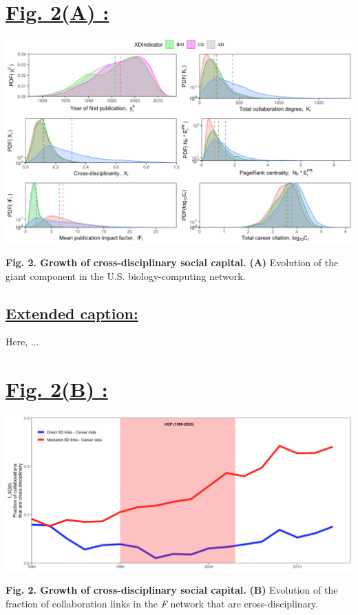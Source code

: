 \documentclass{article}\usepackage[]{graphicx}\usepackage[]{color}
\begin{document}
\section*{\underline{Fig. 2(A) :}}
\begin{center}
\includegraphics[scale=0.4]{3_ggplot.png}
\newline
\par{\textbf{Fig. 2. Growth of cross-disciplinary social capital.} \textbf{(A)} Evolution of the giant component in the U.S. biology-computing network.}
\end{center}
\subsection*{\underline{Extended caption:}}
\par{Here, ...}

\newpage
\section*{\underline{Fig. 2(B) :}}
\begin{center}
\includegraphics[scale=0.4]{2B.png}
\newline
\par{\textbf{Fig. 2. Growth of cross-disciplinary social capital.} \textbf{(B)} Evolution of the fraction of collaboration links in the \textit{F} network that are cross-disciplinary.}
\end{center}
\end{document}
